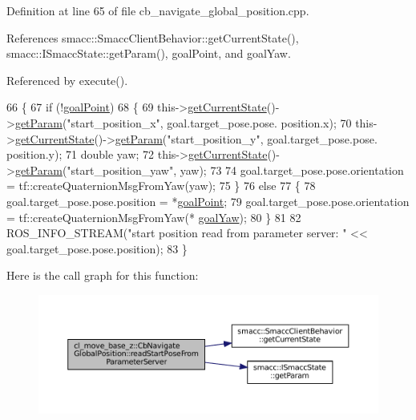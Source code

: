 Definition at line 65 of file cb\+\_\+navigate\+\_\+global\+\_\+position.\+cpp.



References smacc\+::\+Smacc\+Client\+Behavior\+::get\+Current\+State(), smacc\+::\+I\+Smacc\+State\+::get\+Param(), goal\+Point, and goal\+Yaw.



Referenced by execute().


\begin{DoxyCode}
66 \{
67     \textcolor{keywordflow}{if} (!\hyperlink{classcl__move__base__z_1_1CbNavigateGlobalPosition_a1960e244a242b2c308fb717617bbbecb}{goalPoint})
68     \{
69         this->\hyperlink{classsmacc_1_1SmaccClientBehavior_abf6773e4dd948f932f11a346dd6e7c2c}{getCurrentState}()->\hyperlink{classsmacc_1_1ISmaccState_abbb3a24b912c6e8de28f7b86123b6357}{getParam}(\textcolor{stringliteral}{"start\_position\_x"}, goal.target\_pose.pose.
      position.x);
70         this->\hyperlink{classsmacc_1_1SmaccClientBehavior_abf6773e4dd948f932f11a346dd6e7c2c}{getCurrentState}()->\hyperlink{classsmacc_1_1ISmaccState_abbb3a24b912c6e8de28f7b86123b6357}{getParam}(\textcolor{stringliteral}{"start\_position\_y"}, goal.target\_pose.pose.
      position.y);
71         \textcolor{keywordtype}{double} yaw;
72         this->\hyperlink{classsmacc_1_1SmaccClientBehavior_abf6773e4dd948f932f11a346dd6e7c2c}{getCurrentState}()->\hyperlink{classsmacc_1_1ISmaccState_abbb3a24b912c6e8de28f7b86123b6357}{getParam}(\textcolor{stringliteral}{"start\_position\_yaw"}, yaw);
73 
74         goal.target\_pose.pose.orientation = tf::createQuaternionMsgFromYaw(yaw);
75     \}
76     \textcolor{keywordflow}{else}
77     \{
78         goal.target\_pose.pose.position = *\hyperlink{classcl__move__base__z_1_1CbNavigateGlobalPosition_a1960e244a242b2c308fb717617bbbecb}{goalPoint};
79         goal.target\_pose.pose.orientation = tf::createQuaternionMsgFromYaw(*
      \hyperlink{classcl__move__base__z_1_1CbNavigateGlobalPosition_a839900de7f664b27c9be189fadbaa003}{goalYaw});
80     \}
81 
82     ROS\_INFO\_STREAM(\textcolor{stringliteral}{"start position read from parameter server: "} << goal.target\_pose.pose.position);
83 \}
\end{DoxyCode}
Here is the call graph for this function\+:
\nopagebreak
\begin{figure}[H]
\begin{center}
\leavevmode
\includegraphics[width=350pt]{classcl__move__base__z_1_1CbNavigateGlobalPosition_a868b25f238e3781c9a2e44b4e1502fcc_cgraph}
\end{center}
\end{figure}
